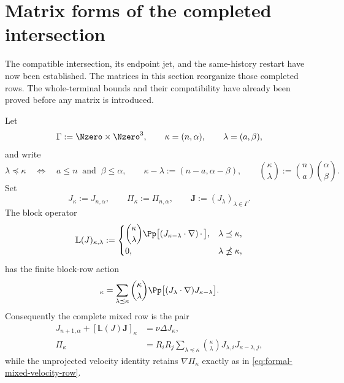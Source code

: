 \section{Matrix forms of the completed intersection}
\label{sec:matrix-forms}

The compatible intersection, its endpoint jet, and the same-history restart
have now been established.  The matrices in this section reorganize those
completed rows.  The whole-terminal bounds and their compatibility have
already been proved before any matrix is introduced.

\begin{proposition}
\label{prop:formal-mixed-index-matrix}
Let
\[
 \Gamma:=\Nzero\times\Nzero^3,
 \qquad
 \kappa=(n,\alpha),
 \qquad
 \lambda=(a,\beta),
\]
and write
\[
 \lambda\preceq\kappa
 \quad\Longleftrightarrow\quad
 a\le n\ \text{ and }\ \beta\le\alpha,
 \qquad
 \kappa-\lambda:=(n-a,\alpha-\beta),
 \qquad
 \binom\kappa\lambda:=\binom na\binom\alpha\beta.
\]
Set
\[
 J_\kappa:=J_{n,\alpha},
 \qquad
 \Pi_\kappa:=\Pi_{n,\alpha},
 \qquad
 \mathbf J:=(J_\lambda)_{\lambda\in\Gamma}.
\]
The block operator
\begin{equation}
 \mathbb L(J)_{\kappa,\lambda}
 :=
 \begin{cases}
 \displaystyle
 \binom\kappa\lambda
 \Pp\bigl[(J_{\kappa-\lambda}\cdot\nabla)\,\mathord\cdot\,\bigr],
 &\lambda\preceq\kappa,\\[6pt]
 0,&\lambda\npreceq\kappa,
 \end{cases}
 \label{eq:formal-mixed-transport-matrix}
\end{equation}
has the finite block-row action
\begin{equation}
 [\mathbb L(J)\mathbf J]_\kappa
 =\sum_{\lambda\preceq\kappa}\binom\kappa\lambda
   \Pp\bigl[(J_\lambda\cdot\nabla)J_{\kappa-\lambda}\bigr].
 \label{eq:formal-mixed-transport-row}
\end{equation}
Consequently the complete mixed row is the pair
\begin{align}
 J_{n+1,\alpha}+[\mathbb L(J)\mathbf J]_\kappa
 &=\nu\Delta J_\kappa,
 \label{eq:formal-mixed-projected-matrix-row}\\
 \Pi_\kappa
 &=R_iR_j\sum_{\lambda\preceq\kappa}\binom\kappa\lambda
   J_{\lambda,i}J_{\kappa-\lambda,j},
 \label{eq:formal-mixed-matrix-pressure-row}
\end{align}
while the unprojected velocity identity retains
\(\nabla\Pi_\kappa\) exactly as in
\eqref{eq:formal-mixed-velocity-row}.


\end{proposition}
